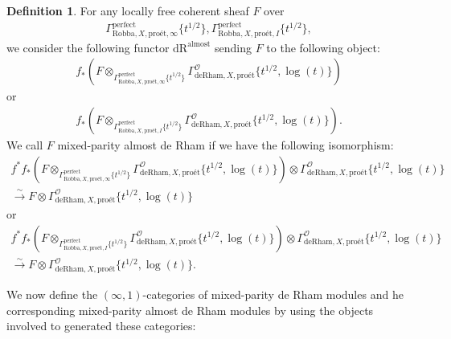 \documentclass[12pt]{book}
\theoremstyle{definition}
\newtheorem{definition}{Definition}
\begin{document}
\begin{definition}
For any locally free coherent sheaf $F$ over
\begin{align}
\Gamma^\mathrm{perfect}_{\text{Robba},X,\text{pro\'et},\infty}\{t^{1/2}\},\Gamma^\mathrm{perfect}_{\text{Robba},X,\text{pro\'et},I}\{t^{1/2}\},
\end{align} 
we consider the following functor $\mathrm{dR}^\mathrm{almost}$ sending $F$ to the following object:
\begin{align}
f_*(F\otimes_{\Gamma^\mathrm{perfect}_{\text{Robba},X,\text{pro\'et},\infty}\{t^{1/2}\}} \Gamma^\mathcal{O}_{\text{deRham},X,\text{pro\'et}}\{t^{1/2},\log(t)\})
\end{align}
or 
\begin{align}
f_*(F\otimes_{\Gamma^\mathrm{perfect}_{\text{Robba},X,\text{pro\'et},I}\{t^{1/2}\}} \Gamma^\mathcal{O}_{\text{deRham},X,\text{pro\'et}}\{t^{1/2},\log(t)\}).
\end{align}
We call $F$ mixed-parity almost de Rham if we have the following isomorphism:
\begin{align}
f^*f_*(F\otimes_{\Gamma^\mathrm{perfect}_{\text{Robba},X,\text{pro\'et},\infty}\{t^{1/2}\}} \Gamma^\mathcal{O}_{\text{deRham},X,\text{pro\'et}}\{t^{1/2},\log(t)\}) \otimes \Gamma^\mathcal{O}_{\text{deRham},X,\text{pro\'et}}\{t^{1/2},\log(t)\} \\
\overset{\sim}{\longrightarrow} F \otimes \Gamma^\mathcal{O}_{\text{deRham},X,\text{pro\'et}}\{t^{1/2},\log(t)\} 
\end{align}
or 
\begin{align}
f^*f_*(F\otimes_{\Gamma^\mathrm{perfect}_{\text{Robba},X,\text{pro\'et},I}\{t^{1/2}\}} \Gamma^\mathcal{O}_{\text{deRham},X,\text{pro\'et}}\{t^{1/2},\log(t)\}) \otimes \Gamma^\mathcal{O}_{\text{deRham},X,\text{pro\'et}}\{t^{1/2},\log(t)\}\\ \overset{\sim}{\longrightarrow} F \otimes \Gamma^\mathcal{O}_{\text{deRham},X,\text{pro\'et}}\{t^{1/2},\log(t)\}. 
\end{align}
\end{definition}

\noindent We now define the $(\infty,1)$-categories of mixed-parity de Rham modules and he corresponding mixed-parity almost de Rham modules by using the objects involved to generated these categories:
\end{document}
